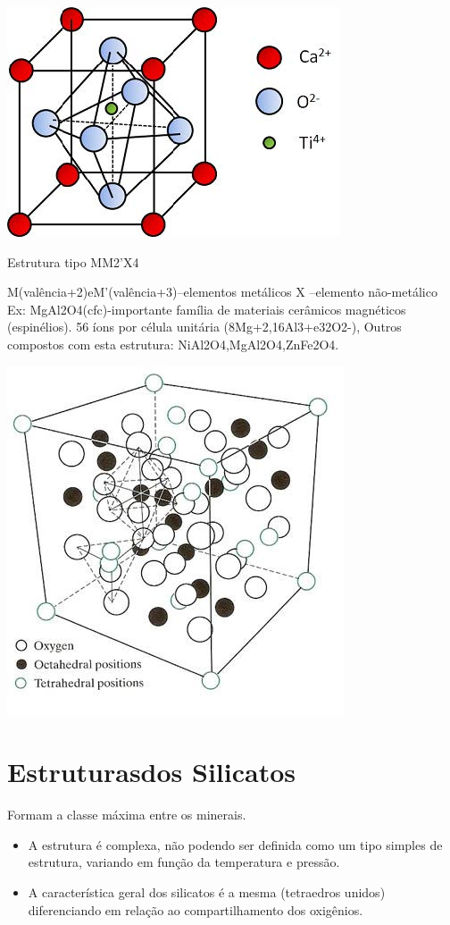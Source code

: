   \includegraphics[scale=0.5,trim={0 0 0 0}]{figures/CaTiO}
  
  
Estrutura tipo MM2'X4

M(valência+2)eM'(valência+3)–elementos metálicos
X –elemento não-metálico
Ex: MgAl2O4(cfc)-importante família de materiais cerâmicos magnéticos (espinélios).
56 íons por célula unitária (8Mg+2,16Al3+e32O2-),
Outros compostos com esta estrutura: NiAl2O4,MgAl2O4,ZnFe2O4.

 \includegraphics[scale=0.3,trim={0 0 0 0}]{figures/MgAlO}

\section{Estruturasdos Silicatos}
Formam a classe máxima entre os minerais.

\begin{itemize}
	\item A estrutura é complexa, não podendo ser definida como um tipo simples de estrutura, variando em função da temperatura e pressão.
	\item A característica geral dos silicatos é a mesma (tetraedros unidos) diferenciando em relação ao compartilhamento dos oxigênios.
\end{itemize}

